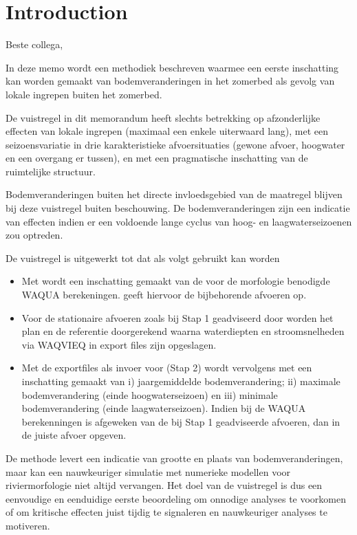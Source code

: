 \chapter{Introduction}

Beste collega,

In deze memo wordt een methodiek beschreven waarmee een eerste inschatting kan worden gemaakt van bodemveranderingen in het zomerbed als gevolg van lokale ingrepen buiten het zomerbed.

De vuistregel in dit memorandum heeft slechts betrekking op afzonderlijke effecten van lokale ingrepen (maximaal een enkele uiterwaard lang), met een seizoensvariatie in drie karakteristieke afvoersituaties (gewone afvoer, hoogwater en een overgang er tussen), en met een pragmatische inschatting van de ruimtelijke structuur.

Bodemveranderingen buiten het directe invloedsgebied van de maatregel blijven bij deze vuistregel buiten beschouwing.
De bodemveranderingen zijn een indicatie van effecten indien er een voldoende lange cyclus van hoog- en laagwaterseizoenen zou optreden.

De vuistregel is uitgewerkt tot \dfastmi dat als volgt gebruikt kan worden

\begin{itemize}
\item Met \dfastmi wordt een inschatting gemaakt van de voor de morfologie benodigde WAQUA berekeningen.
\dfastmi geeft hiervoor de bijbehorende afvoeren op.

\item Voor de stationaire afvoeren zoals bij Stap 1 geadviseerd door \dfastmi worden het plan en de referentie doorgerekend waarna waterdiepten en stroomsnelheden via WAQVIEQ in export files zijn opgeslagen.

\item Met de exportfiles als invoer voor \dfastmi (Stap 2) wordt vervolgens met \dfastmi een inschatting gemaakt van i) jaargemiddelde bodemverandering; ii) maximale bodemverandering (einde hoogwaterseizoen) en iii) minimale bodemverandering (einde laagwaterseizoen).
Indien bij de WAQUA berekenningen is afgeweken van de bij Stap 1 geadviseerde afvoeren, dan in \dfastmi de juiste afvoer opgeven.
\end{itemize}

De methode levert een indicatie van grootte en plaats van bodemveranderingen, maar kan een nauwkeuriger simulatie met numerieke modellen voor riviermorfologie niet altijd vervangen.
Het doel van de vuistregel is dus een eenvoudige en eenduidige eerste beoordeling om onnodige analyses te voorkomen of om kritische effecten juist tijdig te signaleren en nauwkeuriger analyses te motiveren.

